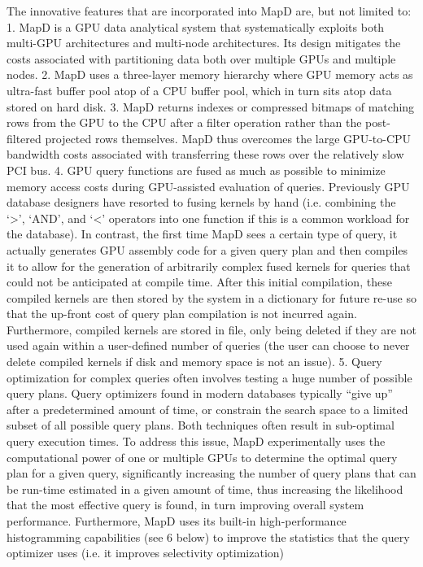 \documentclass[twocolumn]{article}
\begin{document}
The innovative features that are incorporated into MapD are, but not limited to:
1. MapD is a GPU data analytical system that systematically exploits both multi-GPU architectures and multi-node architectures. Its design mitigates the costs associated with partitioning data both over multiple GPUs and multiple nodes.
2. MapD uses a three-layer memory hierarchy where GPU memory acts as ultra-fast buffer pool atop of a CPU buffer pool, which in turn sits atop data stored on hard disk.
3. MapD returns indexes or compressed bitmaps of matching rows from the GPU to the CPU after a filter operation rather than the post-filtered projected rows themselves. MapD thus overcomes the large GPU-to-CPU bandwidth costs associated with transferring these rows over the relatively slow PCI bus.
4. GPU query functions are fused as much as possible to minimize memory access costs during GPU-assisted evaluation of queries. Previously GPU database designers have resorted to fusing kernels by hand (i.e. combining the ‘>’, ‘AND’, and ‘<’ operators into one function if this is a common workload for the database). In contrast, the first time MapD sees a certain type of query, it actually generates GPU assembly code for a given query plan and then compiles it to allow for the generation of arbitrarily complex fused kernels for queries that could not be anticipated at compile time. After this initial compilation, these compiled kernels are then stored by the system in a dictionary for future re-use so that the up-front cost of query plan compilation is not incurred again. Furthermore, compiled kernels are stored in file, only being deleted if they are not used again within a user-defined number of queries (the user can choose to never delete compiled kernels if disk and memory space is not an issue).
5. Query optimization for complex queries often involves testing a huge number of possible query plans. Query optimizers found in modern databases typically “give up” after a predetermined amount of time, or constrain the search space to a limited subset of all possible query plans. Both techniques often result in sub-optimal query execution times. To address this issue, MapD experimentally uses the computational power of one or multiple GPUs to determine the optimal query plan for a given query, significantly increasing the number of query plans that can be run-time estimated in a given amount of time, thus increasing the likelihood that the most effective query is found, in turn improving overall system performance. Furthermore, MapD uses its built-in high-performance histogramming capabilities (see 6 below) to improve the statistics that the query optimizer uses (i.e. it improves selectivity optimization)
\end{document}
